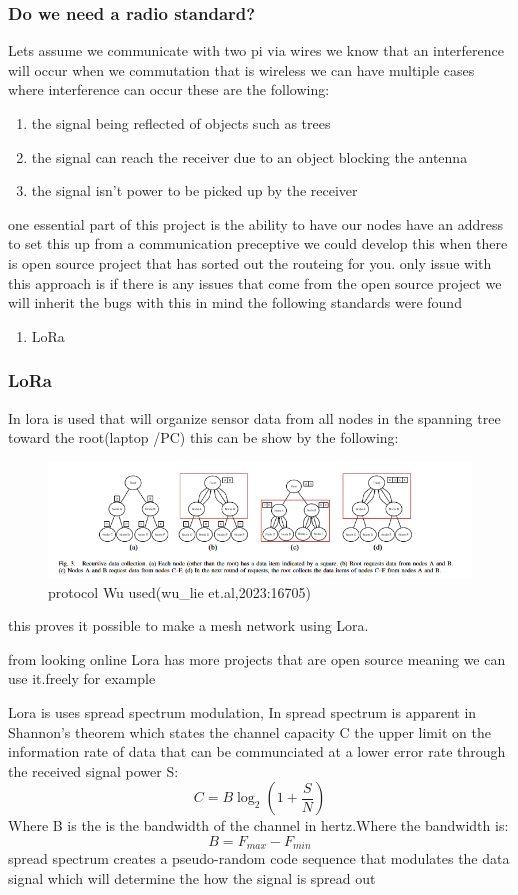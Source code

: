 \subsubsection{Do we need a radio standard?}
Lets assume we communicate with two pi via wires  we know that an interference will occur when  we  commutation that is wireless
we can have multiple cases where interference can  occur these are  the following:
\begin{enumerate}
    \item the signal being reflected of objects such as  trees
    \item the signal can reach the  receiver due to an object blocking the antenna
    \item the signal isn't  power to be picked up by the receiver
\end{enumerate}
one essential part of this project is the  ability to have  our nodes have an address to set this up
from a communication preceptive we could develop this when there is open source project that has sorted out the routeing for  you.
only issue with this approach is if there is any issues that come from the open source project we will inherit the bugs
with this in mind the following standards were found
\begin{enumerate}
    \item LoRa
\end{enumerate}
\subsubsection{LoRa}

In \cite{Wu_Liebeherr_2023} lora is used that will organize sensor
data from all nodes in the spanning tree toward the root(laptop /PC) this can be show by the  following:
\begin{figure}[h!]
    \centering
    \includegraphics[width=0.5\linewidth]{Images/lora_example_routing_proto.png}
    \caption{protocol Wu used(wu\_lie et.al,2023:16705)}
    \label{protocol Wu used(wu_lie et.al,2023:16705)}
\end{figure}  
this proves it possible  to make a  mesh network using Lora.
\par 
from looking online Lora has more projects that are open source meaning we can use it.freely for example 
\par
Lora is uses spread spectrum modulation, In \cite{2003_Information_2023} spread spectrum is apparent in Shannon's theorem which states the channel capacity C the upper limit on the information rate of data that can be communciated at a lower error rate through the received signal power S:
$$C=B\log_2(1+\frac{S}{N})$$
Where B is the is the bandwidth of the channel in hertz.Where the bandwidth is:
$$B=F_{max}-F_{min}$$
spread spectrum  creates a pseudo-random code sequence that modulates the data signal  which will determine the  how  the signal is  spread out 
